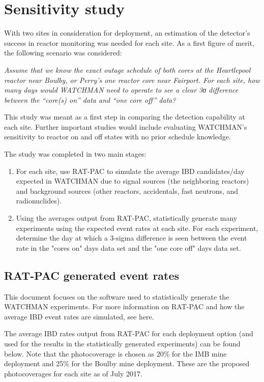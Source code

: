 \documentclass{article}
\begin{document}
\section{Sensitivity study}

With two sites in consideration for deployment, an estimation of the 
detector's success in reactor monitoring was needed for each site.
As a first figure of merit, the following scenario was considered:

\vspace{1cm}
\textit{Assume that we know the exact outage schedule of both cores at the 
    Heartlepool reactor near Boulby, or Perry’s one reactor core near
    Fairport.  For each site, how many days would WATCHMAN need to 
    operate to see a clear 3σ difference between the “core(s) on” data
    and “one core off” data?}
\vspace{1cm}

This study was meant as a first step in comparing the detection capability
at each site.  Further important studies would include evaluating
WATCHMAN's sensitivity to reactor on and off states with no prior
schedule knowledge.

The study was completed in two main stages:
\begin{enumerate}
    \item For each site, use RAT-PAC to simulate 
        the average IBD candidates/day expected in WATCHMAN
        due to signal sources (the neighboring reactors) and background
        sources (other reactors, accidentals, fast neutrons, and
        radionuclides).
    \item Using the averages output from RAT-PAC, statistically generate
        many experiments using the expected event rates at each site.  
        For each experiment, determine the day at which a 3-sigma difference
        is seen between the event rate in the "cores on" days data set and
        the "one core off" days data set.
\end{enumerate}

\subsection{RAT-PAC generated event rates}
This document focuses on the software used to statistically generate the
WATCHMAN experiments.  For more information on RAT-PAC and how the 
average IBD event rates are simulated, see here.

The average IBD rates output from RAT-PAC for each deployment option
(and used for the results in the statistically generated experiments)
can be found below.  Note that the photocoverage is chosen as 20\% for the
IMB mine deployment and 25\% for the Boulby mine deployment.  These are
the proposed photocoverages for each site as of July 2017.
\end{document}
